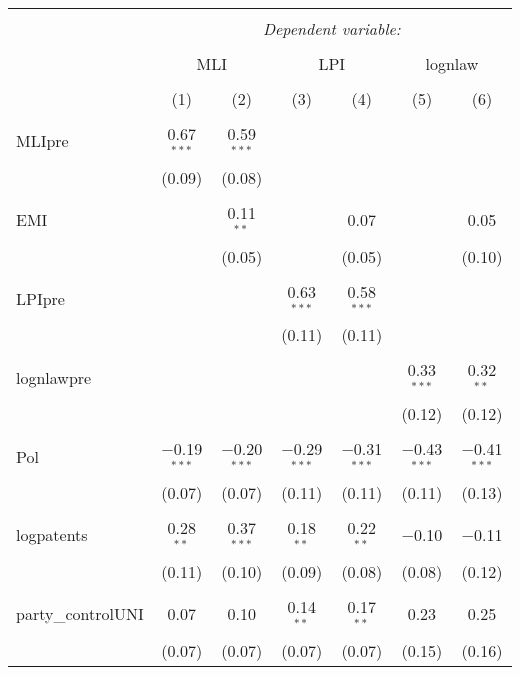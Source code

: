 
\begin{table}[!htbp] \centering 
  \caption{} 
  \label{} 
\begin{tabular}{@{\extracolsep{5pt}}lcccccc} 
\\[-1.8ex]\hline 
\hline \\[-1.8ex] 
 & \multicolumn{6}{c}{\textit{Dependent variable:}} \\ 
\cline{2-7} 
\\[-1.8ex] & \multicolumn{2}{c}{MLI} & \multicolumn{2}{c}{LPI} & \multicolumn{2}{c}{lognlaw} \\ 
\\[-1.8ex] & (1) & (2) & (3) & (4) & (5) & (6)\\ 
\hline \\[-1.8ex] 
 MLIpre & 0.67$^{***}$ & 0.59$^{***}$ &  &  &  &  \\ 
  & (0.09) & (0.08) &  &  &  &  \\ 
  & & & & & & \\ 
 EMI &  & 0.11$^{**}$ &  & 0.07 &  & 0.05 \\ 
  &  & (0.05) &  & (0.05) &  & (0.10) \\ 
  & & & & & & \\ 
 LPIpre &  &  & 0.63$^{***}$ & 0.58$^{***}$ &  &  \\ 
  &  &  & (0.11) & (0.11) &  &  \\ 
  & & & & & & \\ 
 lognlawpre &  &  &  &  & 0.33$^{***}$ & 0.32$^{**}$ \\ 
  &  &  &  &  & (0.12) & (0.12) \\ 
  & & & & & & \\ 
 Pol & $-$0.19$^{***}$ & $-$0.20$^{***}$ & $-$0.29$^{***}$ & $-$0.31$^{***}$ & $-$0.43$^{***}$ & $-$0.41$^{***}$ \\ 
  & (0.07) & (0.07) & (0.11) & (0.11) & (0.11) & (0.13) \\ 
  & & & & & & \\ 
 logpatents & 0.28$^{**}$ & 0.37$^{***}$ & 0.18$^{**}$ & 0.22$^{**}$ & $-$0.10 & $-$0.11 \\ 
  & (0.11) & (0.10) & (0.09) & (0.08) & (0.08) & (0.12) \\ 
  & & & & & & \\ 
 party\_controlUNI & 0.07 & 0.10 & 0.14$^{**}$ & 0.17$^{**}$ & 0.23 & 0.25 \\ 
  & (0.07) & (0.07) & (0.07) & (0.07) & (0.15) & (0.16) \\ 

\end{tabular}
\end{table}
